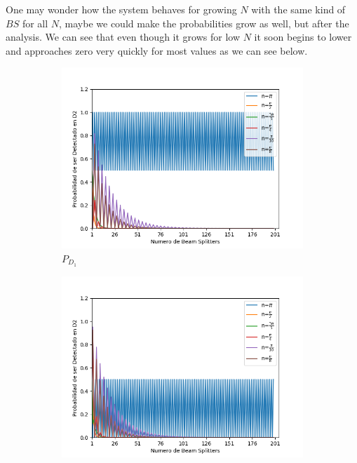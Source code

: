\documentclass{book}
\begin{document}
One may wonder how the system behaves for growing $N$ with the same kind of $BS$ for all $N$, maybe we could make the probabilities grow as well, but after the analysis. We can see that even though it grows for low $N$ it soon begins to lower and approaches zero very quickly for most values as we can see below.


\begin{figure}[!htb]
\centering
\begin{subfigure}[b]{0.45\linewidth}
\includegraphics[width=\linewidth]{images/BsFijo_azumaD1.png}
\caption{$P_{D_{1}}$}
\label{fig:BS1}
\end{subfigure}
\begin{subfigure}[b]{0.45\linewidth}
\includegraphics[width=\linewidth]{images/BsFijo_azumaD2.png}

\end{subfigure}
\end{figure}
\end{document}
